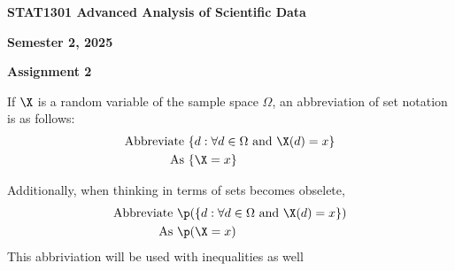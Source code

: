 \begin{center}

{\Large  {\bf STAT1301 Advanced Analysis of Scientific Data}}
\medskip

{\large {\bf Semester 2, 2025}}

\medskip

{\large {\bf Assignment 2}}


\end{center}

If $\X$ is a random variable of the sample space $\Omega$, an abbreviation of set notation is as follows:
\begin{align}
\text{Abbreviate	} & \{ d : \forall d \in \Omega \text{ and } \X(d) = x \} \\
\text{As	} & \{ \X = x \}
\end{align}

Additionally, when thinking in terms of sets becomes obselete,
\begin{align}
\text{Abbreviate	} & \p (\{ d : \forall d \in \Omega \text{ and } \X(d) = x \}) \\
\text{As	} & \p (\X = x)
\end{align}
This abbriviation will be used with inequalities as well

